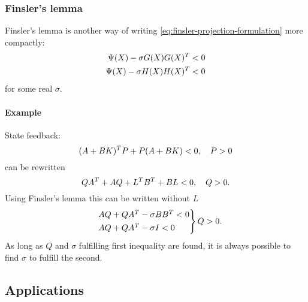 \subsubsection{Finsler's lemma}
Finsler's lemma is another way of writing \eqref{eq:finsler-projection-formulation} more compactly:
%
\begin{equation}
  \begin{split}
    \Psi(X) - \sigma G(X) G(X)^{T} &< 0 \\
    \Psi(X) - \sigma H(X) H(X)^{T} &< 0
  \end{split}
\end{equation}
%
for some real $\sigma$.

\paragraph{Example} State feedback:
%
\begin{equation}
  (A + BK)^{T} P + P(A + BK) < 0,\quad P > 0
\end{equation}
%
can be rewritten
%
\begin{equation}
  QA^{T} + AQ + L^{T} B^{T} + BL < 0,\quad Q > 0.
\end{equation}
%
Using Finsler's lemma this can be written without $L$
%
\begin{equation}
  \begin{rcases}
    &AQ + QA^{T} - \sigma BB^{T} < 0 \\
    &AQ + QA^{T} - \sigma I < 0
  \end{rcases} Q > 0.
\end{equation}
%
As long as $Q$ and $\sigma$ fulfilling first inequality are found, it is always possible to find $\sigma$ to fulfill the second.

\subsection{Applications}

